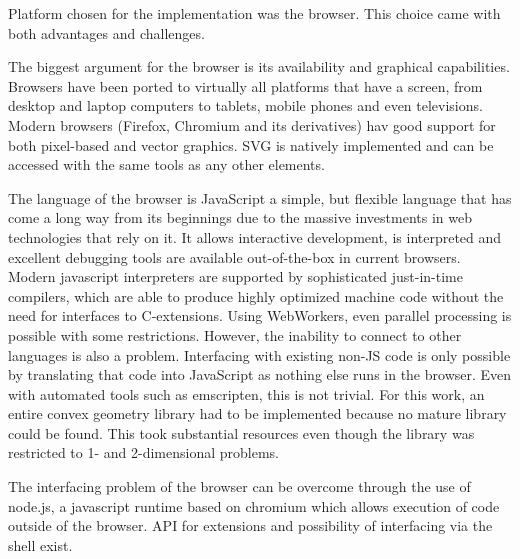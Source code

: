 Platform chosen for the implementation was the browser.
This choice came with both advantages and challenges.

The biggest argument for the browser is its availability and graphical capabilities.
Browsers have been ported to virtually all platforms that have a screen, from desktop and laptop computers to tablets, mobile phones and even televisions.
Modern browsers (Firefox, Chromium and its derivatives) hav good support for both pixel-based and vector graphics.
SVG is natively implemented and can be accessed with the same tools as any other elements.

The language of the browser is JavaScript a simple, but flexible language that has come a long way from its beginnings due to the massive investments in web technologies that rely on it.
It allows interactive development, is interpreted and excellent debugging tools are available out-of-the-box in current browsers.
Modern javascript interpreters are supported by sophisticated just-in-time compilers, which are able to produce highly optimized machine code without the need for interfaces to C-extensions.
Using WebWorkers, even parallel processing is possible with some restrictions.
However, the inability to connect to other languages is also a problem.
Interfacing with existing non-JS code is only possible by translating that code into JavaScript as nothing else runs in the browser.
Even with automated tools such as emscripten, this is not trivial.
For this work, an entire convex geometry library had to be implemented because no mature library could be found.
This took substantial resources even though the library was restricted to 1- and 2-dimensional problems.

The interfacing problem of the browser can be overcome through the use of node.js, a javascript runtime based on chromium which allows execution of code outside of the browser.
API for extensions and possibility of interfacing via the shell exist.

